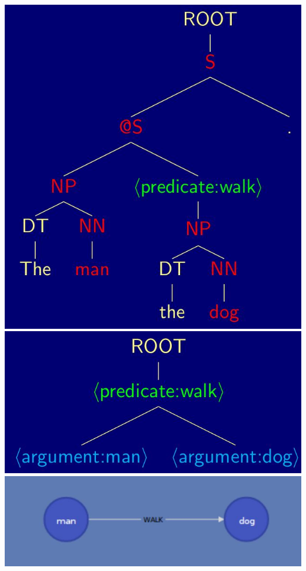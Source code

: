 \includegraphics[width=\textwidth]{media/relation_extraction_7.jpg}
\includegraphics[width=\textwidth]{media/relation_extraction_8.jpg}
\includegraphics[width=\textwidth]{media/relation_extraction_9.jpg}

